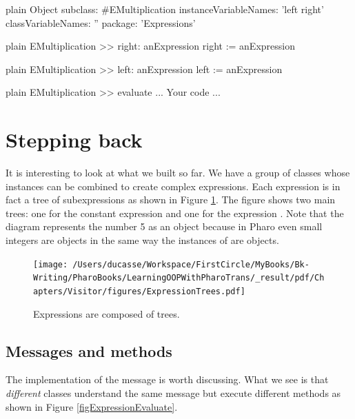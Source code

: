 \documentclass[10pt,twoside,english]{_support/latex/sbabook/sbabook}
\begin{document}
\begin{displaycode}{plain}
Object subclass: #EMultiplication
	instanceVariableNames: 'left right'
	classVariableNames: ''
	package: 'Expressions'
\end{displaycode}

\begin{displaycode}{plain}
EMultiplication >> right: anExpression
	right := anExpression
\end{displaycode}

\begin{displaycode}{plain}
EMultiplication >> left: anExpression
	left := anExpression
\end{displaycode}

\begin{displaycode}{plain}
EMultiplication >> evaluate
	... Your code ...
\end{displaycode}
\section{Stepping back }
It is interesting to look at what we built so far. We have a group of classes whose instances can be combined to create complex expressions. Each expression is in fact a tree of subexpressions as shown in Figure \ref{fig:ExpressionTrees}. The figure shows two main trees: one  for the constant expression  and one for the expression . Note that the diagram represents the number 5 as an object because in Pharo even small integers are objects in the same way the instances of  are objects. 


\begin{figure}

\begin{center}
\texttt{[image: /Users/ducasse/Workspace/FirstCircle/MyBooks/Bk-Writing/PharoBooks/LearningOOPWithPharoTrans/\_result/pdf/Chapters/Visitor/figures/ExpressionTrees.pdf]}\caption{Expressions are composed of trees.\label{fig:ExpressionTrees}}\end{center}
\end{figure}

\subsection{Messages and methods}
The implementation of the  message is worth discussing. What we see is that \textit{different} classes understand the same message but execute different methods as shown in Figure \ref{figExpressionEvaluate}.
\end{document}
